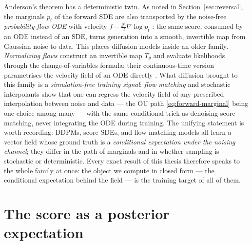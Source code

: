 Anderson's theorem has a deterministic twin. As noted in
Section~\ref{sec:reversal}, the marginals $p_t$ of the forward SDE are also
transported by the noise-free \emph{probability-flow ODE} with velocity
$f - \tfrac{g^2}{2}\nabla \log p_t$ \citep{song2021scorebased}: the same
score, consumed by an ODE instead of an SDE, turns generation into a
smooth, invertible map from Gaussian noise to data. This places diffusion
models inside an older family. \emph{Normalizing flows}
\citep{rezende2015variational, papamakarios2021normalizing} construct an
invertible map $T_\theta$ and evaluate likelihoods through the
change-of-variables formula; their continuous-time version parametrises the
velocity field of an ODE directly \citep{chen2018neural}. What diffusion
brought to this family is a \emph{simulation-free training signal}:
\emph{flow matching} \citep{lipman2023flow} and stochastic interpolants
\citep{albergo2023building} show that one can regress the velocity field of
any prescribed interpolation between noise and data --- the OU path
\eqref{eq:forward-marginal} being one choice among many --- with the same
conditional trick as denoising score matching, never integrating the ODE
during training. The unifying statement is worth recording: DDPMs, score
SDEs, and flow-matching models all learn a vector field whose ground truth
is a \emph{conditional expectation under the noising channel}; they differ
in the path of marginals and in whether sampling is stochastic or
deterministic. Every exact result of this thesis therefore speaks to the
whole family at once: the object we compute in closed form --- the
conditional expectation behind the field --- is the training target of all
of them.

\section{The score as a posterior expectation}\label{sec:tweedie}

